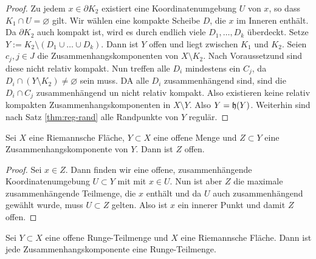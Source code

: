\begin{proof}
  Zu jedem $x \in \partial K_2$ existiert eine Koordinatenumgebung $U$
  von $x$, so dass $K_1 \cap U = \varnothing$ gilt. Wir wählen eine kompakte
  Scheibe $D$, die $x$ im Inneren enthält. Da $\partial K_2$ auch
  kompakt ist, wird es durch endlich viele $D_1, \dots, D_k$
  überdeckt. Setze $Y := K_2 \setminus (D_1 \cup \dots \cup D_k)$. 
  Dann ist $Y$ offen und liegt zwischen $K_1$ und $K_2$. 
  Seien $c_j, j \in J$ die Zusammenhangskomponenten von $X \setminus
  K_2$. Nach Voraussetzund sind diese nicht relativ kompakt. Nun
  treffen alle $D_i$ mindestens ein $C_j$, da $D_i \cap (Y \setminus
  K_2) \neq \varnothing$ sein muss. DA alle $D_i$ zusammenhängend
  sind, sind die $D_i \cap C_j$ zusammenhängend un nicht relativ
  kompakt. Also existieren keine relativ kompakten
  Zusammenhangskomponenten in $X\setminus Y$. Also $Y = \mathfrak{h}(Y)$.
  Weiterhin sind nach Satz \ref{thm:reg-rand} alle Randpunkte von $Y$ regulär.
\end{proof}

\begin{lemma}
  \label{lemma:zsh-komp}
  Sei $X$ eine Riemannsche Fläche, $Y \subset X$ eine offene Menge und
  $Z \subset Y$ eine Zusammenhangskomponente von $Y$. Dann ist $Z$ offen.
\end{lemma}

\begin{proof}
  Sei $x \in Z$. Dann finden wir eine offene, zusammenhängende
  Koordinatenumgebung $U \subset Y$ mit mit $x \in U$. Nun ist aber
  $Z$ die maximale zusammenhängende Teilmenge, die $x$ enthält und da
  $U$ auch zusammenhängend gewählt wurde, muss $U \subset Z$
  gelten. Also ist $x$ ein innerer Punkt und damit $Z$ offen.
\end{proof}

\begin{thm}
  \label{thm:runge-zshkomp}
  Sei $Y \subset X$ eine offene Runge-Teilmenge und $X$ eine
  Riemannsche Fläche. 
  Dann ist jede Zusammenhangskomponente eine Runge-Teilmenge.
\end{thm}

